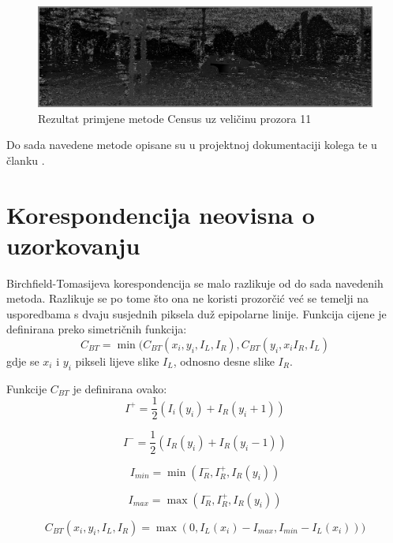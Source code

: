 \documentclass[utf8, zavrsni, numeric]{fer}
\begin{document}
\begin{figure}[htb]
  \centering
  \includegraphics[width=14cm]{img/local_000046_10_Census_11_140.png}
  \caption{Rezultat primjene metode Census uz veličinu prozora 11}
  \label{fig:Census-KITTI}
\end{figure}

Do sada navedene metode opisane su u projektnoj dokumentaciji kolega \cite{projekt1415} te u članku \cite{hirschmuller2007evaluation}.

\section{Korespondencija neovisna o uzorkovanju}

Birchfield-Tomasijeva korespondencija se malo razlikuje od do sada navedenih metoda.
Razlikuje se po tome što ona ne koristi prozorčić već se temelji na usporedbama s dvaju susjednih piksela duž epipolarne linije.
Funkcija cijene je definirana preko simetričnih funkcija:
\[
C_{BT} = \min(C_{BT}(x_i, y_i, I_L, I_R), C_{BT}(y_i, x_i I_R, I_L)
\]
gdje se $x_i$ i $y_i$ pikseli lijeve slike $I_L$, odnosno desne slike $I_R$.

Funkcije $C_{BT}$ je definirana ovako:
\begin{equation}
I^+ = \frac{1}{2}(I_i(y_i) + I_R(y_i + 1))
\end{equation}

\begin{equation}
I^- = \frac{1}{2}(I_R(y_i) + I_R(y_i - 1))
\end{equation}

\begin{equation}
I_{min} = \min(I^-_R, I^+_R, I_R(y_i))
\end{equation}

\begin{equation}
I_{max} = \max(I^-_R, I^+_R, I_R(y_i))
\end{equation}

\begin{equation}
C_{BT}(x_i, y_i, I_L, I_R) = \max(0, I_L(x_i) - I_{max}, I_{min} - I_L(x_i)))
\end{equation}
\end{document}

